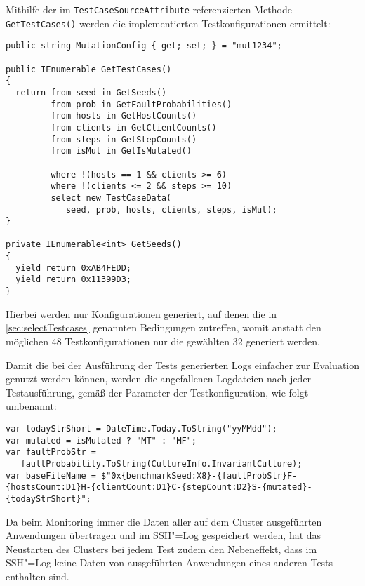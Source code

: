Mithilfe der im \texttt{TestCaseSourceAttribute} referenzierten Methode \texttt{GetTestCases()} werden die implementierten Testkonfigurationen ermittelt:

\begin{lstlisting}[label=lstgetTestCases:,style=cs,
caption={[Implementierung der Testkonfigurationen]
    Implementierung der Testkonfigurationen (gekürzt).
    Die hier nicht gezeigten Methoden zur Rückgabe der implementierten Werte, wie \texttt{GetFaultProbabilities()}, sind nach dem gleichen Schema aufgebaut wie \texttt{GetSeeds()}.
    Mithilfe der Eigenschaft \texttt{MutationConfig} erfolgt die Auswahl des zu verwendeten Mutationsszenarios bei Mutationstests (vgl. \cref{subsec:clusterBasics,sec:implMutationTests}).}]
public string MutationConfig { get; set; } = "mut1234";

public IEnumerable GetTestCases()
{
  return from seed in GetSeeds()
         from prob in GetFaultProbabilities()
         from hosts in GetHostCounts()
         from clients in GetClientCounts()
         from steps in GetStepCounts()
         from isMut in GetIsMutated()
         
         where !(hosts == 1 && clients >= 6)
         where !(clients <= 2 && steps >= 10)
         select new TestCaseData(
            seed, prob, hosts, clients, steps, isMut);
}

private IEnumerable<int> GetSeeds()
{
  yield return 0xAB4FEDD;
  yield return 0x11399D3;
}
\end{lstlisting}

Hierbei werden nur Konfigurationen generiert, auf denen die in \cref{sec:selectTestcases} genannten Bedingungen zutreffen, womit anstatt den möglichen 48 Testkonfigurationen nur die gewählten 32 generiert werden.

Damit die bei der Ausführung der Tests generierten Logs einfacher zur Evaluation genutzt werden können, werden die angefallenen Logdateien nach jeder Testausführung, gemäß der Parameter der Testkonfiguration, wie folgt umbenannt:

\begin{lstlisting}[label=lst:moveTestCaseLogs,style=cs,
caption={Bestimmung des Dateinamens zur Umbenennung der Logdateien}]
var todayStrShort = DateTime.Today.ToString("yyMMdd");
var mutated = isMutated ? "MT" : "MF";
var faultProbStr =
   faultProbability.ToString(CultureInfo.InvariantCulture);
var baseFileName = $"0x{benchmarkSeed:X8}-{faultProbStr}F-{hostsCount:D1}H-{clientCount:D1}C-{stepCount:D2}S-{mutated}-{todayStrShort}";
\end{lstlisting}

Da beim Monitoring immer die Daten aller auf dem Cluster ausgeführten Anwendungen übertragen und im SSH"=Log gespeichert werden, hat das Neustarten des Clusters bei jedem Test zudem den Nebeneffekt, dass im SSH"=Log keine Daten von ausgeführten Anwendungen eines anderen Tests enthalten sind.
